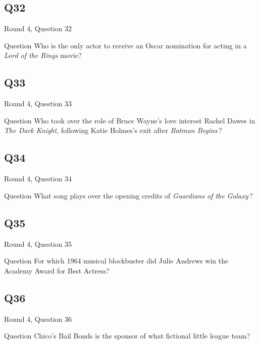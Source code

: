 \documentclass[11pt]{beamer}
\begin{document}
\subsection*{Q32}
\begin{frame}[t]{Round 4, Question 32}
\vspace{2em}
\begin{block}{Question}
Who is the only actor to receive an Oscar nomination for acting in a \emph{Lord of the Rings} movie?
\end{block}
\end{frame}
    

\subsection*{Q33}
\begin{frame}[t]{Round 4, Question 33}
\vspace{2em}
\begin{block}{Question}
Who took over the role of Bruce Wayne's love interest Rachel Dawes in \emph{The Dark Knight}, following Katie Holmes's exit after \emph{Batman Begins}\,?
\end{block}
\end{frame}
    

\subsection*{Q34}
\begin{frame}[t]{Round 4, Question 34}
\vspace{2em}
\begin{block}{Question}
What song plays over the opening credits of \emph{Guardians of the Galaxy}\,?
\end{block}
\end{frame}
    

\subsection*{Q35}
\begin{frame}[t]{Round 4, Question 35}
\vspace{2em}
\begin{block}{Question}
For which 1964 musical blockbuster did Julie Andrews win the Academy Award for Best Actress?
\end{block}
\end{frame}
    

\subsection*{Q36}
\begin{frame}[t]{Round 4, Question 36}
\vspace{2em}
\begin{block}{Question}
Chico's Bail Bonds is the sponsor of what fictional little league team?
\end{block}
\end{frame}
    
\end{document}
